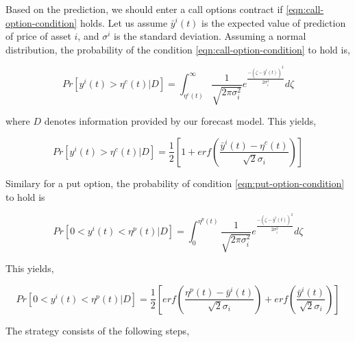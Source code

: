 \documentclass{article}
\begin{document}
Based on the prediction, we should enter a call options contract if
\ref{eqn:call-option-condition} holds. Let us assume $\bar{y}^{i}(t)$
is the expected value of prediction of price of asset $i$, and
$\sigma^{i}$ is the standard deviation. Assuming a normal
distribution, the probability of the condition
\ref{eqn:call-option-condition} to hold is,

\begin{equation}\label{eqn:call-option-prob-intg}
Pr[ y^{i}(t) > \eta^{c}(t) | D ] = \int_{\eta^{c}(t)}^{\infty}
\frac{1}{\sqrt{2\pi\sigma_{i}^{2}}}
e^{\frac{-(\zeta-\bar{y}^{i}(t))^{2}}{2\sigma_{i}^{2}}} d\zeta
\end{equation}

where $D$ denotes information provided by our forecast model. This
yields,

\begin{equation}\label{eqn:call-option-prob}
Pr[ y^{i}(t) > \eta^{c}(t) | D ] = \frac{1}{2} [ 1 + erf(
  \frac{\bar{y}^{i}(t) - \eta^{c}(t)}{\sqrt{2} \sigma_{i}} ) ]
\end{equation}

Similary for a put option, the probability of
condition \ref{eqn:put-option-condition} to hold is

\begin{equation}\label{eqn:put-option-prob-intg}
Pr[ 0 < y^{i}(t) < \eta^{p}(t) | D ] =
\int_{0}^{\eta^{p}(t)} \frac{1}{\sqrt{2\pi\sigma_{i}^{2}}}
e^{\frac{-(\zeta-\bar{y}^{i}(t))^{2}}{2\sigma_{i}^{2}}} d\zeta
\end{equation}

This yields,

\begin{equation}\label{eqn:put-option-prob}
Pr[ 0 < y^{i}(t) < \eta^{p}(t) | D ] = \frac{1}{2} [ erf(
  \frac{\eta^{p}(t)-\bar{y}^{i}(t)}{\sqrt{2} \sigma_{i}} ) +
  erf( \frac{\bar{y}^{i}(t)}{\sqrt{2} \sigma_{i}} ) ]
\end{equation}

The strategy consists of the following steps,
\end{document}
